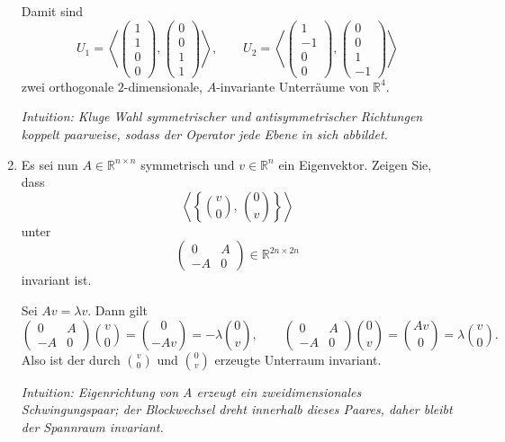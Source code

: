 \documentclass[11pt, a4paper]{article}
\begin{document}
\begin{enumerate}
\begin{framed}
\[  \]
  Damit sind
  \[
    U_1=\left\langle \begin{pmatrix}1\\1\\0\\0\end{pmatrix},
                       \begin{pmatrix}0\\0\\1\\1\end{pmatrix}\right\rangle,
    \qquad
    U_2=\left\langle \begin{pmatrix}1\\-1\\0\\0\end{pmatrix},
                       \begin{pmatrix}0\\0\\1\\-1\end{pmatrix}\right\rangle
  \]
  zwei orthogonale $2$-dimensionale, $A$-invariante Unterräume von $\mathbb{R}^4$.

  \medskip\noindent\textit{Intuition: Kluge Wahl symmetrischer und antisymmetrischer Richtungen koppelt paarweise, sodass der Operator jede Ebene in sich abbildet.}
  \end{framed}

  \item Es sei nun $A\in\mathbb{R}^{n\times n}$ symmetrisch und $v\in\mathbb{R}^n$ ein Eigenvektor. Zeigen Sie, dass
  \[
    \left\langle \left\{ \binom{v}{0},\,\binom{0}{v} \right\} \right\rangle
  \]
  unter
  \[
    \begin{pmatrix}0&A\\ -A&0\end{pmatrix}\in\mathbb{R}^{2n\times 2n}
  \]
  invariant ist.
  \begin{framed}
  Sei $Av=\lambda v$. Dann gilt
  \[
    \begin{pmatrix}0&A\\-A&0\end{pmatrix}\!\binom{v}{0}
      =\binom{0}{-Av}=-\lambda\binom{0}{v},\qquad
    \begin{pmatrix}0&A\\-A&0\end{pmatrix}\!\binom{0}{v}
      =\binom{Av}{0}=\lambda\binom{v}{0}.
  \]
  Also ist der durch $\binom{v}{0}$ und $\binom{0}{v}$ erzeugte Unterraum invariant.

  \medskip\noindent\textit{Intuition: Eigenrichtung von A erzeugt ein zweidimensionales Schwingungspaar; der Blockwechsel dreht innerhalb dieses Paares, daher bleibt der Spannraum invariant.}
  \end{framed}
\end{enumerate}

\vspace{0.5em}
\end{document}
